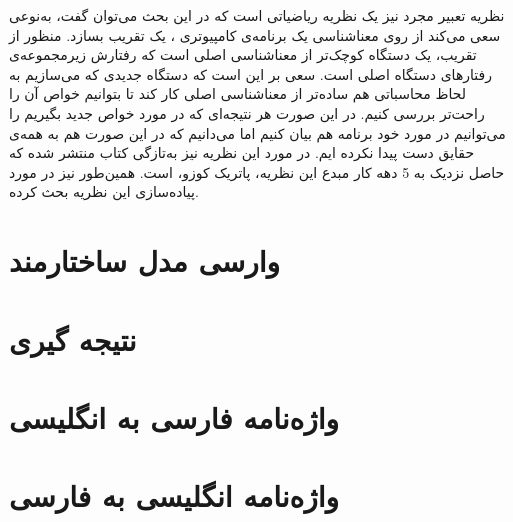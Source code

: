 \documentclass[12pt]{report}
\begin{document}
نظریه تعبیر مجرد\cite{cousot1} نیز یک نظریه ریاضیاتی است که در این بحث می‌توان گفت، به‌نوعی سعی می‌کند از روی معناشناسی یک برنامه‌ی کامپیوتری\cite{winskel} ، یک تقریب بسازد. منظور از تقریب، یک دستگاه کوچک‌تر از معناشناسی اصلی است که رفتارش زیرمجموعه‌ی رفتارهای دستگاه اصلی است. سعی بر این است که دستگاه جدیدی که می‌سازیم به لحاظ محاسباتی هم ساده‌تر از معناشناسی اصلی کار کند تا بتوانیم خواص آن را راحت‌تر بررسی کنیم. در این صورت هر نتیجه‌ای که در مورد خواص جدید بگیریم را می‌توانیم در مورد خود برنامه هم بیان کنیم اما می‌دانیم که در این صورت هم به همه‌ی حقایق دست پیدا نکرده ایم. در مورد این نظریه نیز به‌تازگی کتاب\cite{cousotbook} منتشر شده که حاصل نزدیک به 5 دهه کار مبدع این نظریه، پاتریک کوزو، است. همین‌طور\cite{statica} نیز در مورد پیاده‌سازی این نظریه بحث کرده.



\tableofcontents





\chapter{وارسی مدل ساختارمند}

\chapter{نتیجه گیری}

\chapter*{واژه‌نامه فارسی به انگلیسی}
\chapter*{ واژه‌نامه انگلیسی به فارسی}

\newpage
\begin{latin}
	
	
\end{latin}
\end{document}
